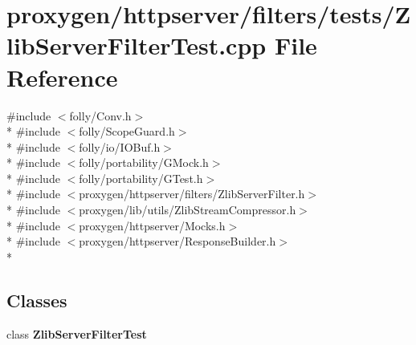\section{proxygen/httpserver/filters/tests/\+Zlib\+Server\+Filter\+Test.cpp File Reference}
\label{ZlibServerFilterTest_8cpp}
{\ttfamily \#include $<$folly/\+Conv.\+h$>$}\\*
{\ttfamily \#include $<$folly/\+Scope\+Guard.\+h$>$}\\*
{\ttfamily \#include $<$folly/io/\+I\+O\+Buf.\+h$>$}\\*
{\ttfamily \#include $<$folly/portability/\+G\+Mock.\+h$>$}\\*
{\ttfamily \#include $<$folly/portability/\+G\+Test.\+h$>$}\\*
{\ttfamily \#include $<$proxygen/httpserver/filters/\+Zlib\+Server\+Filter.\+h$>$}\\*
{\ttfamily \#include $<$proxygen/lib/utils/\+Zlib\+Stream\+Compressor.\+h$>$}\\*
{\ttfamily \#include $<$proxygen/httpserver/\+Mocks.\+h$>$}\\*
{\ttfamily \#include $<$proxygen/httpserver/\+Response\+Builder.\+h$>$}\\*
\subsection*{Classes}
\begin{DoxyCompactItemize}
\item 
class {\bf Zlib\+Server\+Filter\+Test}
\end{DoxyCompactItemize}
